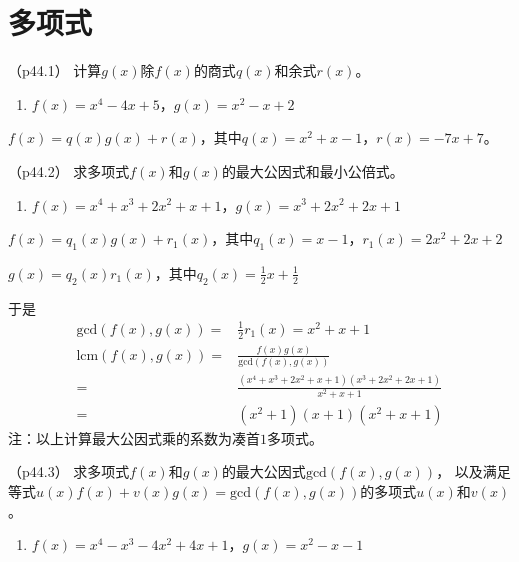 \documentclass[12pt, a4paper, oneside, UTF8]{ctexbook}
\begin{document}
\else
\fi

\chapter{多项式}
\begin{question}（p44.1）
计算$g(x)$除$f(x)$的商式$q(x)$和余式$r(x)$。
\begin{enumerate}[label=(\arabic*)]
    \item $f(x)=x^4-4x+5$，$g(x)=x^2-x+2$
\end{enumerate}
\end{question}

\begin{solution}
    $f(x)=q(x)g(x)+r(x)$，其中$q(x)=x^2+x-1$，$r(x)=-7x+7$。
    
\end{solution}

\begin{question}（p44.2）
    求多项式$f(x)$和$g(x)$的最大公因式和最小公倍式。
    \begin{enumerate}[label=(\arabic*)]
        \item $f(x)=x^4+x^3+2x^2+x+1$，$g(x)=x^3+2x^2+2x+1$
    \end{enumerate}
\end{question}

\begin{solution}
    $f(x)=q_1(x)g(x)+r_1(x)$，其中$q_1(x)=x-1$，$r_1(x)=2x^2+2x+2$

    $g(x)=q_2(x)r_1(x)$，其中$q_2(x)=\frac{1}{2}x+\frac{1}{2}$

    于是
    \begin{align*}
        \mathrm{gcd}(f(x),g(x))=&\frac{1}{2} r_1(x)=x^2+x+1 \\
        \mathrm{lcm}(f(x),g(x))=&\frac{f(x)g(x)}{\mathrm{gcd}(f(x),g(x))} \\
        =&\frac{(x^4+x^3+2x^2+x+1)(x^3+2x^2+2x+1)}{x^2+x+1}\\
        =&(x^2+1)(x+1)(x^2+x+1)
    \end{align*}
    注：以上计算最大公因式乘的系数为凑首$1$多项式。

\end{solution}



\begin{question}（p44.3）
求多项式$f(x)$和$g(x)$的最大公因式$\mathrm{gcd}(f(x),g(x))$，
以及满足等式$u(x)f(x)+v(x)g(x)=\mathrm{gcd}(f(x),g(x))$的多项式$u(x)$和$v(x)$。
\begin{enumerate}[label=(\arabic*)]
    \item $f(x)=x^4-x^3-4x^2+4x+1$，$g(x)=x^2-x-1$
\end{enumerate}
\end{question}
\end{document}
